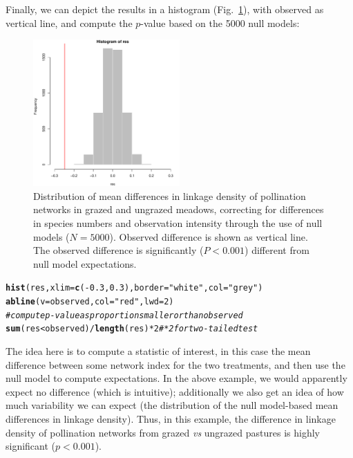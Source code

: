 \documentclass[a4paper, 11pt]{article}\usepackage[]{graphicx}\usepackage[]{color}
\makeatletter
\newcommand{\hlnum}[1]{\textcolor[rgb]{0.686,0.059,0.569}{#1}}%
\newcommand{\hlstr}[1]{\textcolor[rgb]{0.192,0.494,0.8}{#1}}%
\newcommand{\hlcom}[1]{\textcolor[rgb]{0.678,0.584,0.686}{\textit{#1}}}%
\newcommand{\hlopt}[1]{\textcolor[rgb]{0,0,0}{#1}}%
\newcommand{\hlstd}[1]{\textcolor[rgb]{0.345,0.345,0.345}{#1}}%
\newcommand{\hlkwc}[1]{\textcolor[rgb]{0.333,0.667,0.333}{#1}}%
\newcommand{\hlkwd}[1]{\textcolor[rgb]{0.737,0.353,0.396}{\textbf{#1}}}%
\newenvironment{kframe}{%
 \def\at@end@of@kframe{}%
 \ifinner\ifhmode%
  \def\at@end@of@kframe{\end{minipage}}%
  \begin{minipage}{\columnwidth}%
 \fi\fi%
 \def\FrameCommand##1{\hskip\@totalleftmargin \hskip-\fboxsep
 \colorbox{shadecolor}{##1}\hskip-\fboxsep
     \hskip-\linewidth \hskip-\@totalleftmargin \hskip\columnwidth}%
 \MakeFramed {\advance\hsize-\width
   \@totalleftmargin\z@ \linewidth\hsize
   \@setminipage}}%
 {\par\unskip\endMakeFramed%
 \at@end@of@kframe}
\newenvironment{knitrout}{}{} %
\makeatother
\begin{document}
Finally, we can depict the results in a histogram (Fig.~\ref{fig:cattlenull}), with observed as vertical line, and compute the $p$-value based on the 5000 null models:
%
\begin{figure}
\centering
\includegraphics[width=0.5\textwidth]{figures/cattle_nullmodelled}
\caption{Distribution of mean differences in linkage density of pollination networks in grazed and ungrazed meadows, correcting for differences in species numbers and observation intensity through the use of null models ($N=5000$). Observed difference is shown as vertical line. The observed difference is significantly ($P<0.001$) different from null model expectations.}
\label{fig:cattlenull}
\end{figure}
%
\begin{knitrout}
\color{fgcolor}\begin{kframe}
\begin{alltt}
\hlkwd{hist}\hlstd{(res,} \hlkwc{xlim}\hlstd{=}\hlkwd{c}\hlstd{(}\hlopt{-}\hlnum{0.3}\hlstd{,} \hlnum{0.3}\hlstd{),} \hlkwc{border}\hlstd{=}\hlstr{"white"}\hlstd{,} \hlkwc{col}\hlstd{=}\hlstr{"grey"}\hlstd{)}
\hlkwd{abline}\hlstd{(}\hlkwc{v}\hlstd{=observed,} \hlkwc{col}\hlstd{=}\hlstr{"red"}\hlstd{,} \hlkwc{lwd}\hlstd{=}\hlnum{2}\hlstd{)}
\hlcom{# compute p-value as proportion smaller or than observed}
\hlkwd{sum}\hlstd{(res} \hlopt{<} \hlstd{observed)}\hlopt{/}\hlkwd{length}\hlstd{(res)} \hlopt{*} \hlnum{2} \hlcom{# *2 for two-tailed test}
\end{alltt}
\end{kframe}
\end{knitrout}
%
The idea here is to compute a statistic of interest, in this case the mean difference between some network index for the two treatments, and then use the null model to compute expectations. In the above example, we would apparently expect no difference (which is intuitive); additionally we also get an idea of how much variability we can expect (the distribution of the null model-based mean differences in linkage density). Thus, in this example, the difference in linkage density of pollination networks from grazed \emph{vs} ungrazed pastures is highly significant ($p<0.001$).
\end{document}

